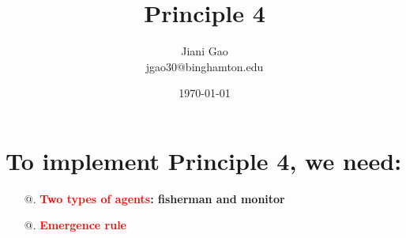 \documentclass[12pt]{article}
\title{\bf Principle 4 }
\author{Jiani Gao\\jgao30@binghamton.edu}
\affil{Department of Economics, Binghamton University}
\date{\today}
\makeatletter
\newcommand{\Rmnum}[1]{\expandafter\@slowromancap\romannumeral #1@}
\makeatother
\begin{document}
\maketitle
\newpage

\newpage
\noindent

\section{To implement Principle 4, we need:}
\begin{itemize}
\item[\Rmnum{1}.] 
 \textbf{\textcolor{red}{Two types of agents}: fisherman and monitor}
 \item[\Rmnum{2}.]
\textbf{\textcolor{red}{Emergence rule}}
\end{itemize}
 
\end{document}
